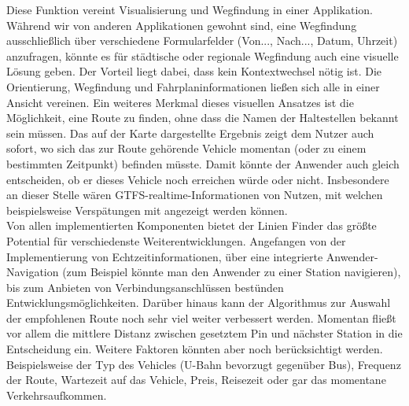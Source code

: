    Diese Funktion vereint Visualisierung und Wegfindung in einer Applikation. Während wir von anderen Applikationen gewohnt sind, eine Wegfindung ausschließlich über verschiedene Formularfelder (Von..., Nach..., Datum, Uhrzeit) anzufragen, könnte es für städtische oder regionale Wegfindung auch eine visuelle Lösung geben. Der Vorteil liegt dabei, dass kein Kontextwechsel nötig ist. Die Orientierung, Wegfindung und Fahrplaninformationen ließen sich alle in einer Ansicht vereinen. Ein weiteres Merkmal dieses visuellen Ansatzes ist die Möglichkeit, eine Route zu finden, ohne dass die Namen der Haltestellen bekannt sein müssen. Das auf der Karte dargestellte Ergebnis zeigt dem Nutzer auch sofort, wo sich das zur Route gehörende Vehicle momentan (oder zu einem bestimmten Zeitpunkt) befinden müsste. Damit könnte der Anwender auch gleich entscheiden, ob er dieses Vehicle noch erreichen würde oder nicht. Insbesondere an dieser Stelle wären GTFS-realtime-Informationen von Nutzen, mit welchen beispielsweise Verspätungen mit angezeigt werden können.\\

    Von allen implementierten Komponenten bietet der Linien Finder das größte Potential für verschiedenste Weiterentwicklungen. Angefangen von der Implementierung von Echtzeitinformationen, über eine integrierte Anwender-Navigation (zum Beispiel könnte man den Anwender zu einer Station navigieren), bis zum Anbieten von Verbindungsanschlüssen bestünden Entwicklungsmöglichkeiten. Darüber hinaus kann der Algorithmus zur Auswahl der empfohlenen Route noch sehr viel weiter verbessert werden. Momentan fließt vor allem die mittlere Distanz zwischen gesetztem Pin und nächster Station in die Entscheidung ein. Weitere Faktoren könnten aber noch berücksichtigt werden. Beispielsweise der Typ des Vehicles (U-Bahn bevorzugt gegenüber Bus), Frequenz der Route, Wartezeit auf das Vehicle, Preis, Reisezeit oder gar das momentane Verkehrsaufkommen.
    
    
    
